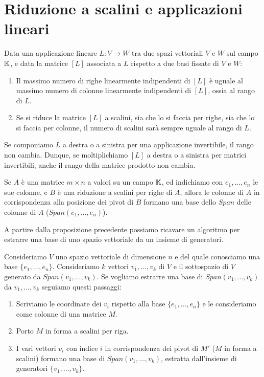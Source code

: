 \section{Riduzione a scalini e applicazioni lineari}

\begin{theorem}
	Data una applicazione lineare $L : V \to W$ tra due spazi vettoriali $V$ e
	$W$ sul campo $\mathbb{K}$, e data la matrice $[L]$ associata a $L$ rispetto
	a due basi fissate di $V$ e $W$:
	\begin{enumerate}
		\item Il massimo numero di righe linearmente indipendenti di $[L]$ è
		      uguale al massimo numero di colonne linearmente indipendenti di
		      $[L]$, ossia al rango di $L$.
		\item Se si riduce la matrice $[L]$ a scalini, sia che lo si faccia
		      per righe, sia che lo si faccia per colonne, il numero di scalini
		      sarà sempre uguale al rango di $L$.
	\end{enumerate}
\end{theorem}

\begin{observation}
	Se componiamo $L$ a destra o a sinistra per una	applicazione invertibile,
	il rango non cambia. Dunque, se moltiplichiamo $[L]$ a destra o a sinistra
	per matrici invertibili, anche il rango della matrice prodotto non cambia.
\end{observation}

\begin{proposition}
	Se $A$ è una matrice $m \times n$ a valori su un campo $\mathbb{K}$, ed
	indichiamo con $e_1, \dots, e_n$ le sue colonne, e $B$ è una riduzione
	a scalini per righe di $A$, allora le colonne di $A$ in corrispondenza alla
	posizione dei pivot di $B$ formano una base dello $Span$ delle colonne di $A$
	($Span(e_1, \dots, e_n)$).
\end{proposition}

\begin{observation}
	A partire dalla proposizione precedente possiamo ricavare un algoritmo per
	estrarre una base di uno spazio vettoriale da un insieme di generatori.

	Consideriamo $V$ uno spazio vettoriale di dimensione $n$ e del quale
	conosciamo una base $\{e_1, \dots, e_n\}$. Consideriamo $k$ vettori
	$v_1, \dots, v_k$ di $V$ e il sottospazio di $V$ generato da
	$Span(v_1, \dots, v_k)$. Se vogliamo estrarre una base di
	$Span(v_1, \dots, v_k)$ da $v_1, \dots, v_k$ seguiamo questi passaggi:
	\begin{enumerate}
		\item Scriviamo le coordinate dei $v_i$ rispetto alla base
		      $\{e_1, \dots, e_n\}$ e le	consideriamo come colonne di
		      una matrice $M$.
		\item Porto $M$ in forma a scalini per riga.
		\item I vari vettori $v_i$ con indice $i$ in corrispondenza dei pivot di $M'$
		      ($M$ in forma a scalini) formano una base di $Span(v_1, \dots, v_k)$,
		      estratta dall'insieme di generatori $\{v_1, \dots, v_k\}$.
	\end{enumerate}
\end{observation}